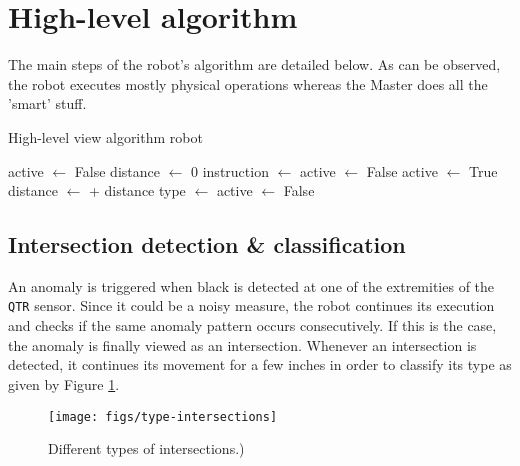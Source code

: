 \documentclass[12pt]{report}
\begin{document}
\section{High-level algorithm}\label{sec:high-algo}
The main steps of the robot's algorithm are detailed below. As can be observed, the robot executes mostly physical operations whereas the Master does all the 'smart' stuff.

\begin{algorithm}
    \caption{High-level view algorithm robot}
    \label{euclid}
    \begin{algorithmic}[1] %
    			\State active $\gets$ False
    			\State distance $\gets$ 0
					\State instruction $\gets$   
						\State \Call{stopMotors}{}
						\State active $\gets$ False
					\Else
						\State {} 
						\State active $\gets$ True
					\EndIf
				\EndIf
					\State {}
					\State distance $\gets$  + distance
					 
						\State type $\gets$  
						\State {} 
						\State {} 
						\State active $\gets$ False
					\EndIf
				\EndIf
				\State {} 
			 \EndWhile        		
        \EndProcedure
    \end{algorithmic}
\end{algorithm}

\subsection*{Intersection detection \& classification}
An anomaly is triggered when black is detected at one of the extremities of the \texttt{QTR} sensor. Since it could be a noisy measure, the robot continues its execution and checks if the same anomaly pattern occurs consecutively. If this is the case, the anomaly is finally viewed as an intersection. Whenever an intersection is detected, it continues its movement for a few inches in order to classify its type as given by Figure \ref{fig:types}.

\begin{figure}[!h]
\centering
\texttt{[image: figs/type-intersections]}
\caption{Different types of intersections.)}
\label{fig:types}
\end{figure}
\end{document}
